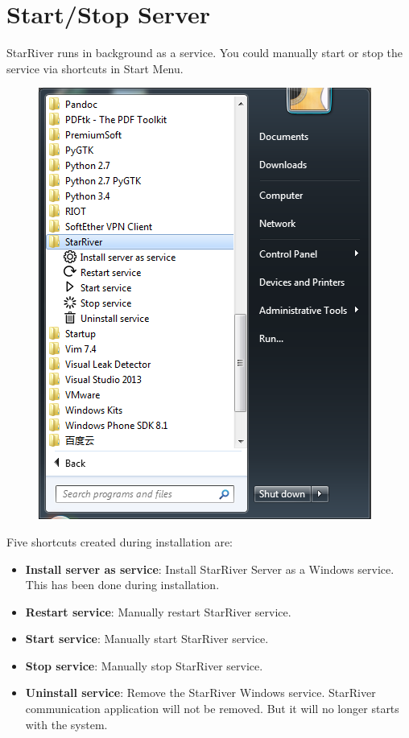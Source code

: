 \section{Start/Stop Server}\label{startstop-server}

StarRiver runs in background as a service. You could manually start or
stop the service via shortcuts in Start Menu.

\begin{figure}[htbp]
\centering
\includegraphics{../img/shortcuts.png}
\end{figure}

Five shortcuts created during installation are:

\begin{itemize}
\itemsep1pt\parskip0pt
\item
  \textbf{Install server as service}: Install StarRiver Server as a
  Windows service. This has been done during installation.
\item
  \textbf{Restart service}: Manually restart StarRiver service.
\item
  \textbf{Start service}: Manually start StarRiver service.
\item
  \textbf{Stop service}: Manually stop StarRiver service.
\item
  \textbf{Uninstall service}: Remove the StarRiver Windows service.
  StarRiver communication application will not be removed. But it will
  no longer starts with the system.
\end{itemize}
